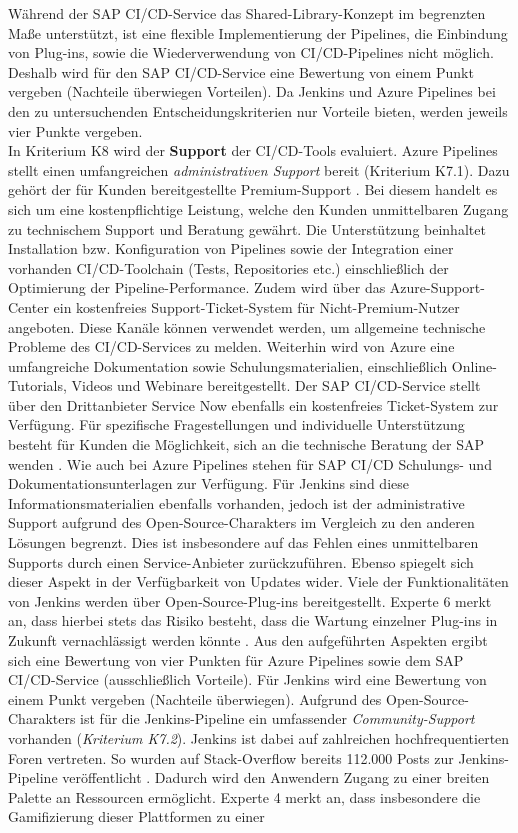 Während der SAP CI/CD-Service das Shared-Library-Konzept im begrenzten Maße  unterstützt, ist eine flexible Implementierung der Pipelines, die Einbindung von Plug-ins, sowie die Wiederverwendung von CI/CD-Pipelines nicht möglich. Deshalb wird für den SAP CI/CD-Service eine Bewertung von einem Punkt vergeben (Nachteile überwiegen Vorteilen). Da Jenkins und Azure Pipelines bei den zu untersuchenden Entscheidungskriterien nur Vorteile bieten, werden jeweils vier Punkte vergeben.\\ In Kriterium K8 wird der \textbf{Support} der CI/CD-Tools evaluiert. Azure Pipelines stellt einen umfangreichen \textit{administrativen Support} bereit (Kriterium K7.1). Dazu gehört der für Kunden bereitgestellte Premium-Support \cite{.20230410e}. Bei diesem handelt es sich um eine kostenpflichtige Leistung, welche den Kunden unmittelbaren Zugang zu technischem Support und Beratung gewährt. Die Unterstützung beinhaltet Installation bzw. Konfiguration von Pipelines sowie der Integration einer vorhanden CI/CD-Toolchain (Tests, Repositories etc.) einschließlich der Optimierung der Pipeline-Performance. Zudem wird über das Azure-Support-Center ein kostenfreies Support-Ticket-System für Nicht-Premium-Nutzer angeboten. Diese Kanäle können verwendet werden, um allgemeine technische Probleme des CI/CD-Services zu melden. Weiterhin wird von Azure eine umfangreiche Dokumentation sowie Schulungsmaterialien, einschließlich Online-Tutorials, Videos und Webinare bereitgestellt. Der SAP CI/CD-Service stellt über den Drittanbieter Service Now ebenfalls ein kostenfreies Ticket-System zur Verfügung. Für spezifische Fragestellungen und individuelle Unterstützung besteht für Kunden die Möglichkeit, sich an die technische Beratung der SAP wenden \cite[Z. 113 ff.]{ProductOwnerSAPBTPProd&Infra.}. Wie auch bei Azure Pipelines stehen für SAP CI/CD Schulungs- und Dokumentationsunterlagen zur Verfügung. Für Jenkins sind diese Informationsmaterialien ebenfalls vorhanden, jedoch ist der administrative Support aufgrund des Open-Source-Charakters im Vergleich zu den anderen Lösungen begrenzt. Dies ist insbesondere auf das Fehlen eines unmittelbaren Supports durch einen Service-Anbieter zurückzuführen. Ebenso spiegelt sich dieser Aspekt in der Verfügbarkeit von Updates wider. Viele der Funktionalitäten von Jenkins werden über Open-Source-Plug-ins bereitgestellt. Experte 6 merkt an, dass hierbei stets das Risiko besteht, dass die Wartung einzelner Plug-ins in Zukunft vernachlässigt werden könnte \cite[29 ff.]{FullStackEntwicklerSAPDTSIntegration.}. Aus den aufgeführten Aspekten ergibt sich eine Bewertung von vier Punkten für Azure Pipelines sowie dem SAP CI/CD-Service (ausschließlich Vorteile). Für Jenkins wird eine Bewertung von einem Punkt vergeben (Nachteile überwiegen). Aufgrund des Open-Source-Charakters ist für die Jenkins-Pipeline ein umfassender \textit{Community-Support} vorhanden (\textit{Kriterium K7.2}). Jenkins ist dabei auf zahlreichen hochfrequentierten Foren vertreten. So wurden auf Stack-Overflow bereits 112.000 Posts zur Jenkins-Pipeline veröffentlicht \cite{StackOverflow.20230403d}. Dadurch wird den Anwendern Zugang zu einer breiten Palette an Ressourcen ermöglicht. Experte 4 merkt an, dass insbesondere die Gamifizierung dieser Plattformen zu einer 